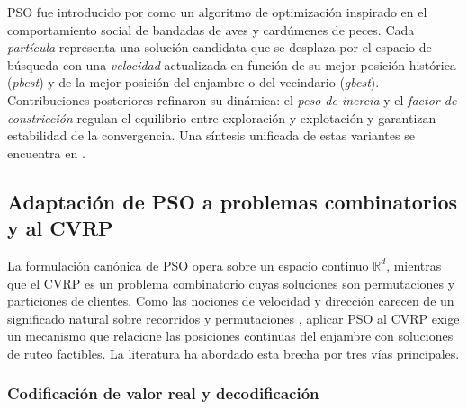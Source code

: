 PSO fue introducido por \textcite{kennedy1995particle} como un algoritmo de optimización
inspirado en el comportamiento social de bandadas de aves y cardúmenes de peces. Cada
\textit{partícula} representa una solución candidata que se desplaza por el espacio de
búsqueda con una \textit{velocidad} actualizada en función de su mejor posición
histórica (\textit{pbest}) y de la mejor posición del enjambre o del vecindario
(\textit{gbest}). Contribuciones posteriores refinaron su dinámica: el
\textit{peso de inercia} \parencite{shi1998modified} y el \textit{factor de constricción}
\parencite{clerc2002particle} regulan el equilibrio entre exploración y explotación y
garantizan estabilidad de la convergencia. Una síntesis unificada de estas variantes se
encuentra en \textcite{poli2007particle}.


\subsection{Adaptación de PSO a problemas combinatorios y al CVRP}
\label{subsec:adaptacion_pso}

La formulación canónica de PSO opera sobre un espacio continuo $\mathbb{R}^d$, mientras
que el CVRP es un problema combinatorio cuyas soluciones son permutaciones y particiones
de clientes. Como las nociones de velocidad y dirección carecen de un significado natural
sobre recorridos y permutaciones \parencite{poli2007particle}, aplicar PSO al CVRP exige
un mecanismo que relacione las posiciones continuas del enjambre con soluciones de ruteo
factibles. La literatura ha abordado esta brecha por tres vías principales.

\subsubsection{Codificación de valor real y decodificación}

